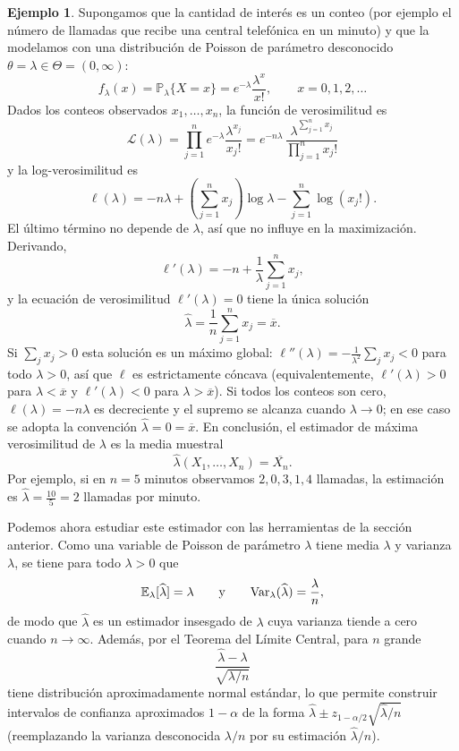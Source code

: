 \documentclass[12pt]{amsart}
\theoremstyle{definition}
\newtheorem{examplex}[lemma]{Ejemplo}
\newcommand{\PP}{\ensuremath{\mathbb{P}}}
\newcommand{\EE}{\ensuremath{\mathbb{E}}}
\newcommand{\calL}{\ensuremath{\mathcal{L}}}
\begin{document}
\begin{examplex} \label{ex: EMV Poisson} Supongamos que la cantidad de interés es un conteo (por ejemplo el número de llamadas que recibe una central telefónica en un minuto) y que la modelamos con una distribución de Poisson de parámetro desconocido $\theta=\lambda\in\Theta=(0,\infty)$:
\[f_\lambda(x)=\PP_\lambda\{X=x\}=e^{-\lambda}\frac{\lambda^x}{x!},\qquad x=0,1,2,\dots\]
Dados los conteos observados $x_1,\dots,x_n$, la función de verosimilitud es
\[\calL(\lambda)=\prod_{j=1}^n e^{-\lambda}\frac{\lambda^{x_j}}{x_j!}=e^{-n\lambda}\,\frac{\lambda^{\sum_{j=1}^n x_j}}{\prod_{j=1}^n x_j!}\]
y la log-verosimilitud es
\[\ell(\lambda)=-n\lambda+\left(\sum_{j=1}^n x_j\right)\log\lambda-\sum_{j=1}^n\log(x_j!).\]
El último término no depende de $\lambda$, así que no influye en la maximización. Derivando,
\[\ell'(\lambda)=-n+\frac{1}{\lambda}\sum_{j=1}^n x_j,\]
y la ecuación de verosimilitud $\ell'(\lambda)=0$ tiene la única solución
\[\widehat{\lambda}=\frac{1}{n}\sum_{j=1}^n x_j=\overline{x}.\]
Si $\sum_j x_j>0$ esta solución es un máximo global: $\ell''(\lambda)=-\frac{1}{\lambda^2}\sum_j x_j<0$ para todo $\lambda>0$, así que $\ell$ es estrictamente cóncava (equivalentemente, $\ell'(\lambda)>0$ para $\lambda<\overline{x}$ y $\ell'(\lambda)<0$ para $\lambda>\overline{x}$). Si todos los conteos son cero, $\ell(\lambda)=-n\lambda$ es decreciente y el supremo se alcanza cuando $\lambda\to 0$; en ese caso se adopta la convención $\widehat{\lambda}=0=\overline{x}$. En conclusión, el estimador de máxima verosimilitud de $\lambda$ es la media muestral
\[\widehat{\lambda}(X_1,\dots,X_n)=\overline{X_n}.\]
Por ejemplo, si en $n=5$ minutos observamos $2,0,3,1,4$ llamadas, la estimación es $\widehat{\lambda}=\frac{10}{5}=2$ llamadas por minuto.

Podemos ahora estudiar este estimador con las herramientas de la sección anterior. Como una variable de Poisson de parámetro $\lambda$ tiene media $\lambda$ y varianza $\lambda$, se tiene para todo $\lambda>0$ que
\[\EE_\lambda[\widehat{\lambda}]=\lambda\qquad\text{y}\qquad {\rm Var}_\lambda(\widehat{\lambda})=\frac{\lambda}{n},\]
de modo que $\widehat{\lambda}$ es un estimador insesgado de $\lambda$ cuya varianza tiende a cero cuando $n\to\infty$. Además, por el Teorema del Límite Central, para $n$ grande
\[\frac{\widehat{\lambda}-\lambda}{\sqrt{\lambda/n}}\]
tiene distribución aproximadamente normal estándar, lo que permite construir intervalos de confianza aproximados $1-\alpha$ de la forma $\widehat{\lambda}\pm z_{1-\alpha/2}\sqrt{\widehat{\lambda}/n}$ (reemplazando la varianza desconocida $\lambda/n$ por su estimación $\widehat{\lambda}/n$).
\end{examplex}
\end{document}
